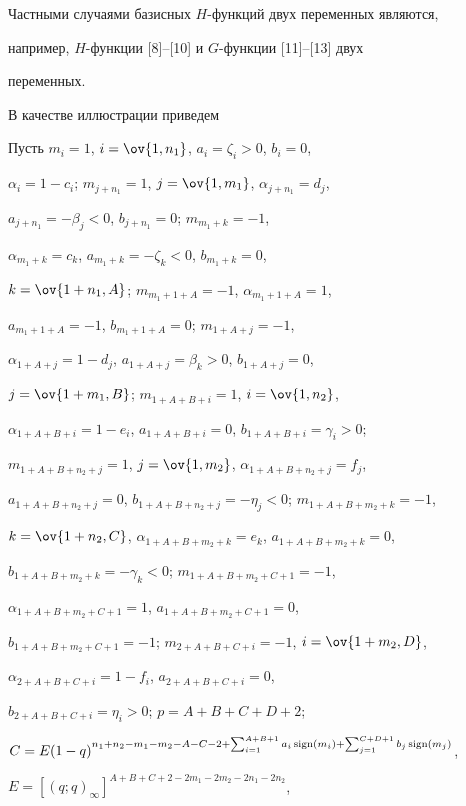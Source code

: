 


Частными случаями базисных $H$-функций двух переменных являются, 


например, $H$-функции [8]--[10] и $G$-функции [11]--[13] двух 


переменных. 


 


В качестве иллюстрации приведем 


 


\begin{exam} 


Пусть $m_i=1$, $i=\ov{1,n_1}$, $a_i=\zeta_i>0$, $b_i=0$, 


$\alpha_i=1-c_i$; $m_{j+n_1}=1$, $j=\ov{1,m_1}$, $\alpha_{j+n_1}=d_j$, 


$a_{j+n_1}=-\beta_j<0$, $b_{j+n_1}=0$; $m_{m_1+k}=-1$, 


$\alpha_{m_1+k}=c_k$, $a_{m_1+k}=-\zeta_k<0$, $b_{m_1+k}=0$, 


$k=\ov{1+n_1,A}$; $m_{m_1+1+A}=-1$, $\alpha_{m_1+1+A}=1$, 


$a_{m_1+1+A}=-1$, $b_{m_1+1+A}=0$; $m_{1+A+j}=-1$, 


$\alpha_{1+A+j}=1-d_j$, $a_{1+A+j}=\beta_k>0$, $b_{1+A+j}=0$, 


$j=\ov{1+m_1,B}$; $m_{1+A+B+i}=1$, $i=\ov{1,n_2}$, 


$\alpha_{1+A+B+i}=1-e_i$, $a_{1+A+B+i}=0$, $b_{1+A+B+i}=\gamma_i>0$; 


$m_{1+A+B+n_2+j}=1$, $j=\ov{1,m_2}$, $\alpha_{1+A+B+n_2+j}=f_j$, 


$a_{1+A+B+n_2+j}=0$, $b_{1+A+B+n_2+j}=-\eta_j<0$; $m_{1+A+B+m_2+k}=-1$, 


$k=\ov{1+n_2,C}$, $\alpha_{1+A+B+m_2+k}=e_k$, $a_{1+A+B+m_2+k}=0$, 


$b_{1+A+B+m_2+k}=-\gamma_k<0$; $m_{1+A+B+m_2+C+1}=-1$, 


$\alpha_{1+A+B+m_2+C+1}=1$, $a_{1+A+B+m_2+C+1}=0$, 


$b_{1+A+B+m_2+C+1}=-1$; $m_{2+A+B+C+i}=-1$, $i=\ov{1+m_2,D}$, 


$\alpha_{2+A+B+C+i}=1-f_i$, $a_{2+A+B+C+i}=0$, 


$b_{2+A+B+C+i}=\eta_i>0$; $p=A+B+C+D+2$; 


$C=E(1-q)^{n_1+n_2-m_1-m_2-A-C-2+\sum^{A+B+1}_{i=1}a_i\sign(m_i)+ 


\sum^{C+D+1}_{j=1}b_j\sign(m_j)}$, 


$E=[(q;q)_\infty]^{A+B+C+2-2m_1-2m_2-2n_1-2n_2}$, 



\end{exam}
